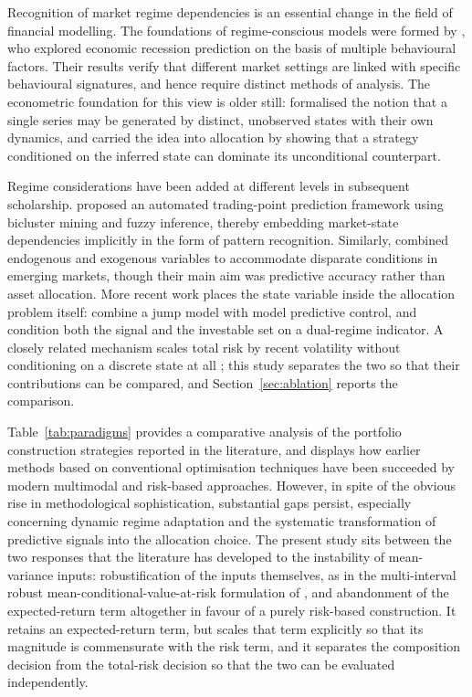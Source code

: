Recognition of market regime dependencies is an essential change in the field of
financial modelling. The foundations of regime-conscious models were formed by
\citet{wang19}, who explored economic recession prediction on the basis of multiple
behavioural factors. Their results verify that different market settings are linked with
specific behavioural signatures, and hence require distinct methods of analysis. The
econometric foundation for this view is older still: \citet{hamilton89} formalised the
notion that a single series may be generated by distinct, unobserved states with their
own dynamics, and \citet{kritzman12} carried the idea into allocation by showing that a
strategy conditioned on the inferred state can dominate its unconditional counterpart.

Regime considerations have been added at different levels in subsequent scholarship.
\citet{huang20} proposed an automated trading-point prediction framework using bicluster
mining and fuzzy inference, thereby embedding market-state dependencies implicitly in the
form of pattern recognition. Similarly, \citet{alsheebah24} combined endogenous and
exogenous variables to accommodate disparate conditions in emerging markets, though their
main aim was predictive accuracy rather than asset allocation. More recent work places
the state variable inside the allocation problem itself: \citet{li25} combine a jump model
with model predictive control, and \citet{luo26} condition both the signal and the
investable set on a dual-regime indicator. A closely related mechanism scales total risk
by recent volatility without conditioning on a discrete state at all
\citep{moreira17,hood25}; this study separates the two so that their contributions can be
compared, and Section~\ref{sec:ablation} reports the comparison.

Table~\ref{tab:paradigms} provides a comparative analysis of the portfolio construction
strategies reported in the literature, and displays how earlier methods based on
conventional optimisation techniques have been succeeded by modern multimodal and
risk-based approaches. However, in spite of the obvious rise in methodological
sophistication, substantial gaps persist, especially concerning dynamic regime adaptation
and the systematic transformation of predictive signals into the allocation choice. The
present study sits between the two responses that the literature has developed to the
instability of mean-variance inputs: robustification of the inputs themselves, as in the
multi-interval robust mean-conditional-value-at-risk formulation of
\citet{khodamoradi23}, and abandonment of the expected-return term altogether in favour
of a purely risk-based construction. It retains an expected-return term, but scales that
term explicitly so that its magnitude is commensurate with the risk term, and it separates
the composition decision from the total-risk decision so that the two can be evaluated
independently.

